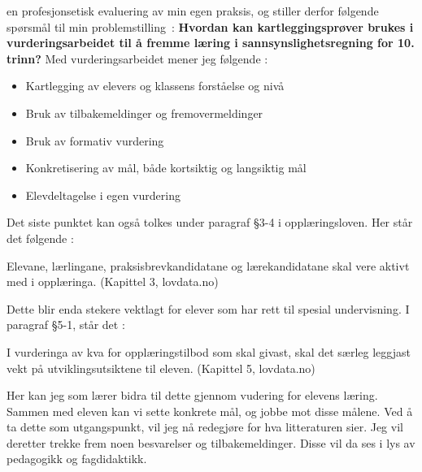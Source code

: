 \documentclass[main.tex]{subfiles}
\begin{document}
en profesjonsetisk evaluering av min egen praksis, og stiller derfor følgende spørsmål til min \mbox{problemstilling :}
\newline
\newline
\textbf{Hvordan kan kartleggingsprøver brukes i vurderingsarbeidet til å fremme læring i 
        sannsynslighetsregning for 10. trinn?}
\newline
\newline
Med vurderingsarbeidet mener jeg følgende :
\begin{itemize}
\item Kartlegging av elevers og klassens forståelse og nivå
\item Bruk av tilbakemeldinger og fremovermeldinger
\item Bruk av formativ vurdering
\item Konkretisering av mål, både kortsiktig og langsiktig mål
\item Elevdeltagelse i egen vurdering
\end{itemize}
Det siste punktet kan også tolkes under paragraf \S 3-4 i opplæringsloven. Her står det følgende : 
\begin{displayquote}
Elevane, lærlingane, praksisbrevkandidatane og lærekandidatane skal vere aktivt med i opplæringa.
(Kapittel 3, lovdata.no)
\end{displayquote}
Dette blir enda stekere vektlagt for elever som har rett til spesial undervisning. I paragraf \S 5-1, står det :
\begin{displayquote}
I vurderinga av kva for opplæringstilbod som skal givast, skal det særleg leggjast vekt på utviklingsutsiktene til eleven.
(Kapittel 5, lovdata.no)
\end{displayquote}
Her kan jeg som lærer bidra til dette gjennom vudering for elevens læring. Sammen med eleven kan vi sette konkrete mål,
og jobbe mot disse målene. Ved å ta dette som utgangspunkt, vil jeg nå redegjøre for hva litteraturen sier.
Jeg vil deretter trekke frem noen besvarelser og tilbakemeldinger. Disse vil da ses i lys av pedagogikk og fagdidaktikk.
\end{document}
